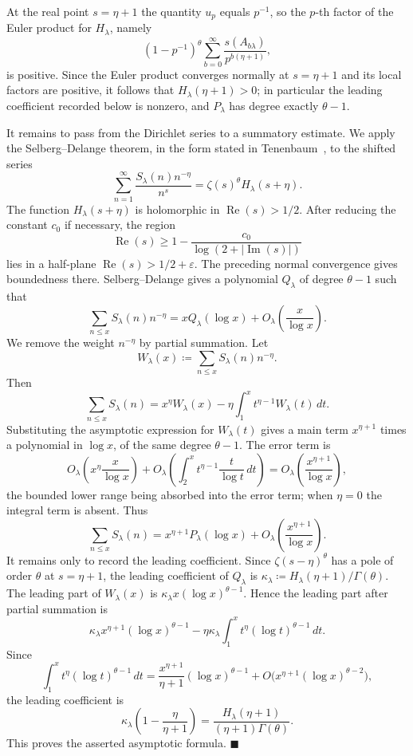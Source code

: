 \documentclass[a4paper,11pt,reqno]{amsart}
\theoremstyle{plain}
\theoremstyle{remark}
\numberwithin{equation}{section}
\renewcommand{\leq}{\leqslant}
\renewcommand{\geq}{\geqslant}
\newenvironment{proofof}{{\bf Proof. }}{\hfill $\blacksquare$ \\}
\begin{document}
\begin{proofof}
At the real point $s=\eta+1$ the quantity $u_p$ equals $p^{-1}$, so the $p$-th
factor of the Euler product for $H_\lambda$, namely
\[
        (1-p^{-1})^\theta
        \sum_{b=0}^{\infty}\frac{s(A_{b\lambda})}{p^{b(\eta+1)}},
\]
is positive. Since the Euler product converges normally at $s=\eta+1$ and its
local factors are positive, it follows that $H_\lambda(\eta+1)>0$; in
particular the leading coefficient recorded below is nonzero, and $P_\lambda$
has degree exactly $\theta-1$.

It remains to pass from the Dirichlet series to a summatory estimate. We apply
the Selberg--Delange theorem, in the form stated in
Tenenbaum~\cite[Chap.~II.5, Th.~5.2]{Tenenbaum}, to the shifted series
\[
        \sum_{n=1}^{\infty}\frac{S_\lambda(n)n^{-\eta}}{n^s}
        =
        \zeta(s)^\theta H_\lambda(s+\eta).
\]
The function $H_\lambda(s+\eta)$ is holomorphic in
$\operatorname{Re}(s)>1/2$. After reducing the constant $c_0$ if necessary, the
region
\[
        \operatorname{Re}(s)\geq
        1-\frac{c_0}{\log(2+|\operatorname{Im}(s)|)}
\]
lies in a half-plane $\operatorname{Re}(s)>1/2+\varepsilon$. The preceding
normal convergence gives boundedness there. Selberg--Delange gives a polynomial
$Q_\lambda$ of degree $\theta-1$ such that
\[
        \sum_{n\leq x}S_\lambda(n)n^{-\eta}
        =
        xQ_\lambda(\log x)+O_\lambda\left(\frac{x}{\log x}\right).
\]
We remove the weight $n^{-\eta}$ by partial summation. Let
\[
        W_\lambda(x)\coloneqq\sum_{n\leq x}S_\lambda(n)n^{-\eta}.
\]
Then
\[
        \sum_{n\leq x}S_\lambda(n)
        =
        x^\eta W_\lambda(x)-\eta\int_1^x t^{\eta-1}W_\lambda(t)\,dt.
\]
Substituting the asymptotic expression for $W_\lambda(t)$ gives a main term
$x^{\eta+1}$ times a polynomial in $\log x$, of the same degree
$\theta-1$. The error term is
\[
        O_\lambda\left(x^\eta\frac{x}{\log x}\right)
        +
        O_\lambda\left(\int_2^x t^{\eta-1}\frac{t}{\log t}\,dt\right)
        =
        O_\lambda\left(\frac{x^{\eta+1}}{\log x}\right),
\]
the bounded lower range being absorbed into the error term; when $\eta=0$ the
integral term is absent. Thus
\[
        \sum_{n\leq x}S_\lambda(n)
        =
        x^{\eta+1}P_\lambda(\log x)
        +O_\lambda\left(\frac{x^{\eta+1}}{\log x}\right).
\]
It remains only to record the leading coefficient. 
Since $\zeta(s-\eta)^\theta$ has a pole of order $\theta$ at $s=\eta+1$, 
the leading coefficient of $Q_\lambda$ is
$\kappa_\lambda\coloneqq H_\lambda(\eta+1)/\Gamma(\theta)$. 
The leading part of $W_\lambda(x)$ is $\kappa_\lambda x(\log x)^{\theta-1}$. 
Hence the leading part after partial summation is
\[
        \kappa_\lambda x^{\eta+1}(\log x)^{\theta-1}
        -
        \eta \kappa_\lambda\int_1^x t^\eta(\log t)^{\theta-1}\,dt.
\]
Since
\[
        \int_1^x t^\eta(\log t)^{\theta-1}\,dt
        =
        \frac{x^{\eta+1}}{\eta+1}(\log x)^{\theta-1}
        +O\bigl(x^{\eta+1}(\log x)^{\theta-2}\bigr),
\]
the leading coefficient is
\[
        \kappa_\lambda\left(1-\frac{\eta}{\eta+1}\right)
        =
        \frac{H_\lambda(\eta+1)}{(\eta+1)\Gamma(\theta)}.
\]
This proves the asserted asymptotic formula.
\end{proofof}
\end{document}
